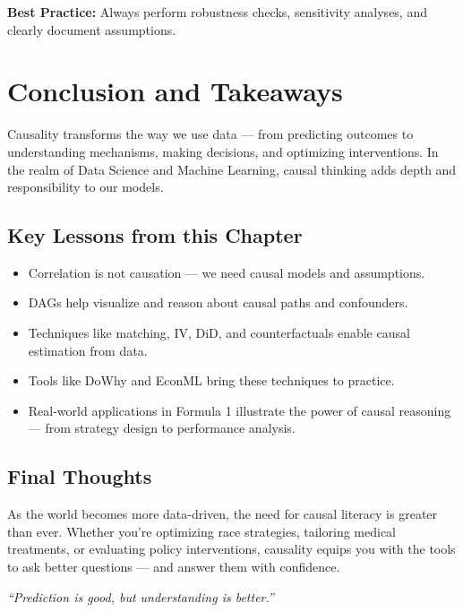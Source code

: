 \documentclass[12pt]{book}
\begin{document}
\textbf{Best Practice:} Always perform robustness checks, sensitivity analyses, and clearly document assumptions.

\section{Conclusion and Takeaways}

Causality transforms the way we use data — from predicting outcomes to understanding mechanisms, making decisions, and optimizing interventions. In the realm of Data Science and Machine Learning, causal thinking adds depth and responsibility to our models.

\subsection*{Key Lessons from this Chapter}

\begin{itemize}
    \item Correlation is not causation — we need causal models and assumptions.
    \item DAGs help visualize and reason about causal paths and confounders.
    \item Techniques like matching, IV, DiD, and counterfactuals enable causal estimation from data.
    \item Tools like DoWhy and EconML bring these techniques to practice.
    \item Real-world applications in Formula 1 illustrate the power of causal reasoning — from strategy design to performance analysis.
\end{itemize}

\subsection*{Final Thoughts}

As the world becomes more data-driven, the need for causal literacy is greater than ever. Whether you're optimizing race strategies, tailoring medical treatments, or evaluating policy interventions, causality equips you with the tools to ask better questions — and answer them with confidence.

\bigskip

\noindent\textit{“Prediction is good, but understanding is better.”}
\end{document}
